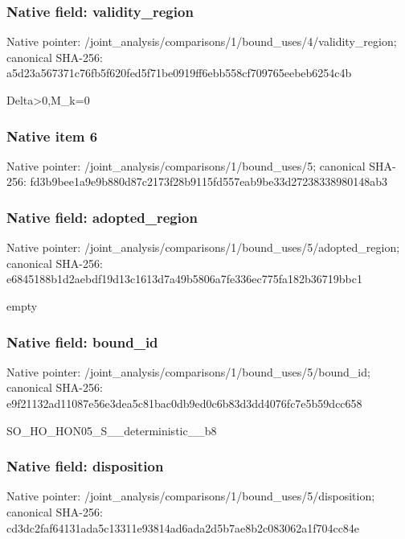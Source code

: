 \documentclass[10pt,a4paper]{article}
\begin{document}
\subsubsection{Native field: validity\_\allowbreak{}region}
Native pointer: /joint\_\allowbreak{}analysis/comparisons/1/bound\_\allowbreak{}uses/4/validity\_\allowbreak{}region; canonical SHA-256: a5d23a567371c76fb5f620fed5f71be0919ff6ebb558cf709765eebeb6254c4b

\begingroup\raggedright\sloppy Delta>0,\allowbreak{}M\_\allowbreak{}k=\allowbreak{}0\par\endgroup

\subsubsection{Native item 6}
Native pointer: /joint\_\allowbreak{}analysis/comparisons/1/bound\_\allowbreak{}uses/5; canonical SHA-256: fd3b9bee1a9e9b880d87c2173f28b9115fd557eab9be33d27238338980148ab3

\subsubsection{Native field: adopted\_\allowbreak{}region}
Native pointer: /joint\_\allowbreak{}analysis/comparisons/1/bound\_\allowbreak{}uses/5/adopted\_\allowbreak{}region; canonical SHA-256: e6845188b1d2aebdf19d13c1613d7a49b5806a7fe336ec775fa182b36719bbc1

\begingroup\raggedright\sloppy empty\par\endgroup

\subsubsection{Native field: bound\_\allowbreak{}id}
Native pointer: /joint\_\allowbreak{}analysis/comparisons/1/bound\_\allowbreak{}uses/5/bound\_\allowbreak{}id; canonical SHA-256: e9f21132ad11087e56e3dea5c81bac0db9ed0c6b83d3dd4076fc7e5b59dcc658

\begingroup\raggedright\sloppy SO\_\allowbreak{}HO\_\allowbreak{}HON05\_\allowbreak{}S\_\allowbreak{}\_\allowbreak{}deterministic\_\allowbreak{}\_\allowbreak{}b8\par\endgroup

\subsubsection{Native field: disposition}
Native pointer: /joint\_\allowbreak{}analysis/comparisons/1/bound\_\allowbreak{}uses/5/disposition; canonical SHA-256: cd3dc2faf64131ada5c13311e93814ad6ada2d5b7ae8b2c083062a1f704cc84e
\end{document}
